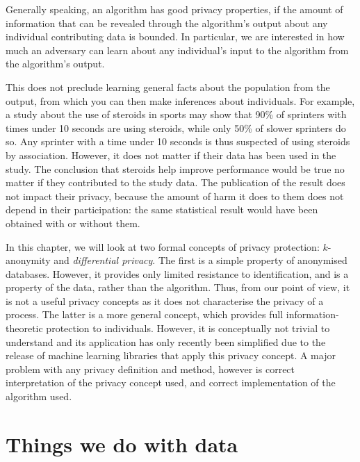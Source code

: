 {  Generally speaking, an algorithm has good privacy properties, if the
  amount of information that can be revealed through the algorithm's
  output about any individual contributing data is bounded. In
  particular, we are interested in how much an adversary can learn
  about any individual's input to the algorithm from the algorithm's
  output.

  This does not preclude learning general facts about the population
  from the output, from which you can then make inferences about
  individuals. For example, a study about the use of steroids in
  sports may show that 90\% of sprinters with times under 10 seconds
  are using steroids, while only 50\% of slower sprinters do so. Any
  sprinter with a time under 10 seconds is thus suspected of using
  steroids by association. However, it does not matter if their data
  has been used in the study. The conclusion that steroids help
  improve performance would be true no matter if they contributed to
  the study data. The publication of the result does not impact their
  privacy, because the amount of harm it does to them does not depend
  in their participation: the same statistical result would have been
  obtained with or without them.
  
  In this chapter, we will look at two formal concepts of privacy
  protection: $k$-anonymity and \emph{differential privacy}. The first
  is a simple property of anonymised databases. However, it provides
  only limited resistance to identification, and is a property of the
  data, rather than the algorithm. Thus, from our point of view, it is
  not a useful privacy concepts as it does not characterise the
  privacy of a process. The latter is a more general concept, which
  provides full information-theoretic protection to
  individuals. However, it is conceptually not trivial to understand
  and its application has only recently been simplified due to the
  release of machine learning libraries that apply this privacy
  concept. A major problem with any privacy definition and method,
  however is correct interpretation of the privacy concept used, and
  correct implementation of the algorithm used.  }



\section{Things we do with data}

